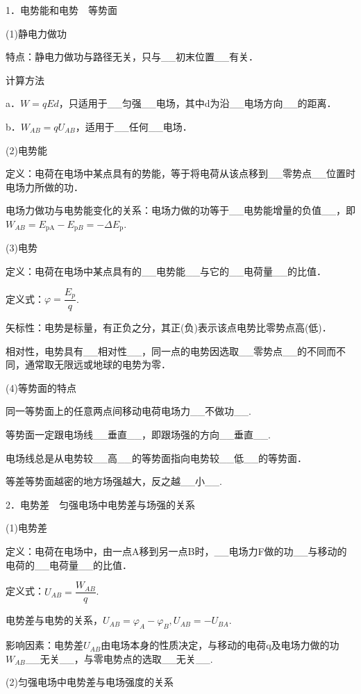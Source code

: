 1．电势能和电势　等势面

(1)静电力做功

特点：静电力做功与路径无关，只与\_\_初末位置\_\_有关．

计算方法

a．$W=qEd$，只适用于\_\_匀强\_\_电场，其中d为沿\_\_电场方向\_\_的距离．

b．$W_{A B}=q U_{A B}$，适用于\_\_任何\_\_电场．

(2)电势能

定义：电荷在电场中某点具有的势能，等于将电荷从该点移到\_\_零势点\_\_位置时电场力所做的功．

电场力做功与电势能变化的关系：电场力做的功等于\_\_电势能增量的负值\_\_，即$W_{A B}=E_{\mathrm{pA}}-E_{\mathrm{p} B}=-\Delta E_{\mathrm{p}}$.

(3)电势

定义：电荷在电场中某点具有的\_\_电势能\_\_与它的\_\_电荷量\_\_的比值．

定义式：$\varphi=\dfrac{E_{p}}{q}$.

矢标性：电势是标量，有正负之分，其正(负)表示该点电势比零势点高(低)．

相对性，电势具有\_\_相对性\_\_，同一点的电势因选取\_\_零势点\_\_的不同而不同，通常取无限远或地球的电势为零．

(4)等势面的特点

同一等势面上的任意两点间移动电荷电场力\_\_不做功\_\_.

等势面一定跟电场线\_\_垂直\_\_，即跟场强的方向\_\_垂直\_\_.

电场线总是从电势较\_\_高\_\_的等势面指向电势较\_\_低\_\_的等势面．

等差等势面越密的地方场强越大，反之越\_\_小\_\_.

2．电势差　匀强电场中电势差与场强的关系

(1)电势差

定义：电荷在电场中，由一点A移到另一点B时，\_\_电场力F做的功\_\_与移动的电荷的\_\_电荷量\_\_的比值．

定义式：$U_{A B}=\dfrac{W_{A B}}{q}$.

电势差与电势的关系，$U_{A B}=\varphi_{A}-\varphi_{B}, U_{A B}=-U_{B A}$.

影响因素：电势差$U_{A B}$由电场本身的性质决定，与移动的电荷q及电场力做的功$W_{AB}$\_\_无关\_\_，与零电势点的选取\_\_无关\_\_.

(2)匀强电场中电势差与电场强度的关系

